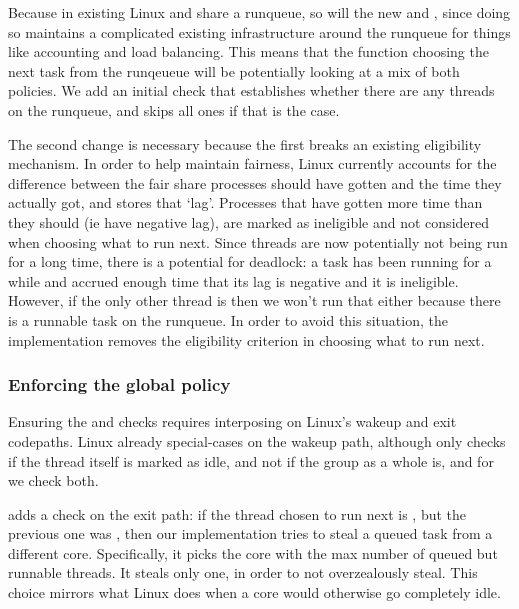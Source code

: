 Because in existing Linux \schedidle{} and \schednormal{} share a runqueue, so
will the new \schedbe{} and \schednormal{}, since doing so maintains a
complicated existing infrastructure around the runqueue for things like
accounting and load balancing. This means that the function choosing the next
task from the runqeueue will be potentially looking at a mix of both policies.
We add an initial check that establishes whether there are any \schednormal{}
threads on the runqueue, and skips all \schedbe{} ones if that is the case. 

The second change is necessary because the first breaks an existing eligibility
mechanism. In order to help maintain fairness, Linux currently accounts for the
difference between the fair share processes should have gotten and the time they
actually got, and stores that `lag'. Processes that have gotten more time than
they should (ie have negative lag), are marked as ineligible and not considered
when choosing what to run next. Since \schedbe{} threads are now potentially not
being run for a long time, there is a potential for deadlock: a \schednormal{}
task has been running for a while and accrued enough time that its lag is
negative and it is ineligible. However, if the only other thread is \schedbe{}
then we won't run that either because there is a runnable \schednormal{} task on
the runqueue. In order to avoid this situation, the implementation removes the
eligibility criterion in choosing what to run next.


\subsubsection{Enforcing the global policy}\label{ss:implementation:exit}

Ensuring the \entry{} and \exit{} checks requires interposing on Linux's wakeup
and exit codepaths. Linux already special-cases on the wakeup path, although
only checks if the thread itself is marked as idle, and not if the group as a
whole is, and for \schedbe{} we check both.

\schedbe{} adds a check on the exit path: if the thread chosen to run next is
\schedbe{}, but the previous one was \schednormal{}, then our implementation
tries to steal a queued \schednormal{} task from a different core. Specifically,
it picks the core with the max number of queued but runnable \schednormal{}
threads. It steals only one, in order to not overzealously steal. This choice
mirrors what Linux does when a core would otherwise go completely idle.

